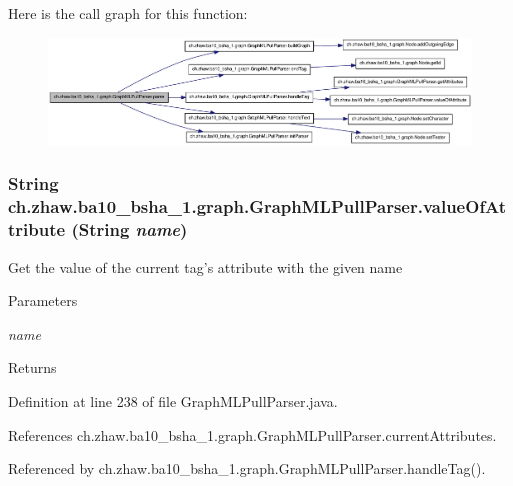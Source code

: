 Here is the call graph for this function:\nopagebreak
\begin{figure}[H]
\begin{center}
\leavevmode
\includegraphics[width=420pt]{classch_1_1zhaw_1_1ba10__bsha__1_1_1graph_1_1GraphMLPullParser_a4d51cf5d2432541f6777df36b8649d70_cgraph}
\end{center}
\end{figure}
\hypertarget{classch_1_1zhaw_1_1ba10__bsha__1_1_1graph_1_1GraphMLPullParser_a4ae4bad785554b69b5f7cefb090b5250}{
\subsubsection[{valueOfAttribute}]{\setlength{\rightskip}{0pt plus 5cm}String ch.zhaw.ba10\_\-bsha\_\-1.graph.GraphMLPullParser.valueOfAttribute (String {\em name})}}
\label{classch_1_1zhaw_1_1ba10__bsha__1_1_1graph_1_1GraphMLPullParser_a4ae4bad785554b69b5f7cefb090b5250}
Get the value of the current tag's attribute with the given name


\begin{DoxyParams}{Parameters}
\item[{\em name}]\end{DoxyParams}
\begin{DoxyReturn}{Returns}

\end{DoxyReturn}


Definition at line 238 of file GraphMLPullParser.java.

References ch.zhaw.ba10\_\-bsha\_\-1.graph.GraphMLPullParser.currentAttributes.

Referenced by ch.zhaw.ba10\_\-bsha\_\-1.graph.GraphMLPullParser.handleTag().

